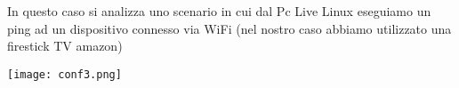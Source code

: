 \documentclass[../lab2.tex]{subfiles}
\begin{document}
    In questo caso si analizza uno scenario in cui dal Pc Live Linux eseguiamo un ping ad un
    dispositivo connesso via WiFi (nel nostro caso abbiamo utilizzato una firestick TV amazon)

    \begin{center}
        \texttt{[image: conf3.png]}
    \end{center}
\end{document}
